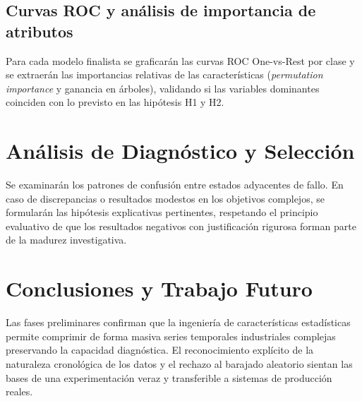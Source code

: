 \documentclass[journal]{IEEEtran}
\begin{document}
\subsection{Curvas ROC y análisis de importancia de atributos}

Para cada modelo finalista se graficarán las curvas ROC One-vs-Rest por clase y se extraerán las importancias relativas de las características (\emph{permutation importance} y ganancia en árboles), validando si las variables dominantes coinciden con lo previsto en las hipótesis H1 y H2.

\section{Análisis de Diagnóstico y Selección}
\label{sec:analisis}


Se examinarán los patrones de confusión entre estados adyacentes de fallo. En caso de discrepancias o resultados modestos en los objetivos complejos, se formularán las hipótesis explicativas pertinentes, respetando el principio evaluativo de que los resultados negativos con justificación rigurosa forman parte de la madurez investigativa.

\section{Conclusiones y Trabajo Futuro}
\label{sec:conclusiones}


Las fases preliminares confirman que la ingeniería de características estadísticas permite comprimir de forma masiva series temporales industriales complejas preservando la capacidad diagnóstica. El reconocimiento explícito de la naturaleza cronológica de los datos y el rechazo al barajado aleatorio sientan las bases de una experimentación veraz y transferible a sistemas de producción reales.



\end{document}

